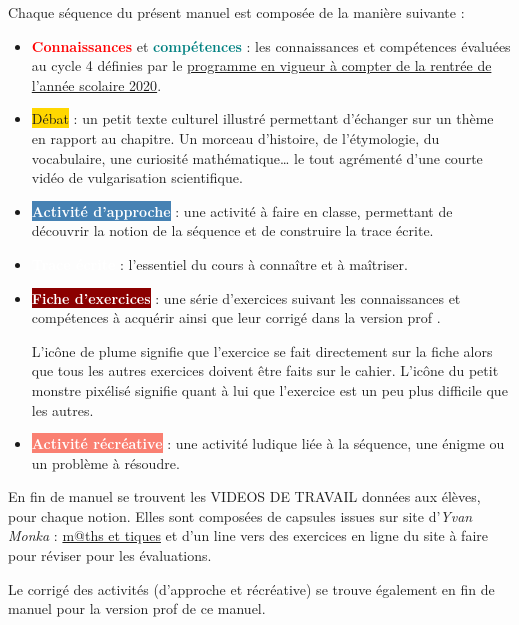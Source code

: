 Chaque séquence du présent manuel est composée de la manière suivante : \par
\begin{itemize}
   \item \textcolor{red}{\bf Connaissances} et \textcolor{teal}{\bf compétences} : les connaissances et compétences évaluées au cycle 4 définies par le \href{https://eduscol.education.fr/document/621/download}{programme en vigueur à compter de la rentrée de l'année scolaire 2020}. \medskip
   \item \colorbox{Gold}{Débat} : un petit texte culturel illustré permettant d'échanger sur un thème en rapport au chapitre. Un morceau d'histoire, de l'étymologie, du vocabulaire, une curiosité mathématique\dots{} le tout agrémenté d'une courte vidéo de vulgarisation scientifique. \medskip
   \item \colorbox{SteelBlue}{\textcolor{white}{\sffamily\bfseries Activité d'approche}} : une activité à faire en classe, permettant de découvrir la notion de la séquence et de construire la trace écrite. \medskip
   \item \colorbox{SteelBlue!60!Black}{\textcolor{white}{\sffamily\bfseries Trace écrite}} : l'essentiel du cours à connaître et à maîtriser. \medskip
   \item \colorbox{DarkRed}{\textcolor{white}{\sffamily\bfseries Fiche d'exercices}} : une série d'exercices suivant les connaissances et compétences à acquérir ainsi que leur corrigé dans la version \og prof \fg. \par
      L'icône de plume  signifie que l'exercice se fait directement sur la fiche alors que tous les autres exercices doivent être faits sur le cahier. L'icône du petit monstre pixélisé  signifie quant à lui que l'exercice est un peu plus difficile que les autres. \medskip
   \item \colorbox{Salmon}{\textcolor{white}{\sffamily\bfseries Activité récréative}} : une activité ludique liée à la séquence, une énigme ou un problème à résoudre.
\end{itemize}

\bigskip

En fin de manuel se trouvent les {\sffamily VIDEOS DE TRAVAIL} données aux élèves, pour chaque notion. Elles sont composées de capsules issues sur site d'{\it Yvan Monka} : \href{https://www.maths-et-tiques.fr}{m@ths et tiques} et d'un line vers des exercices en ligne du site \textcolor{SteelBlue}{} à faire pour réviser pour les évaluations.

\smallskip

Le corrigé des activités (d'approche et récréative) se trouve également en fin de manuel pour la version \og prof \fg{} de ce manuel.